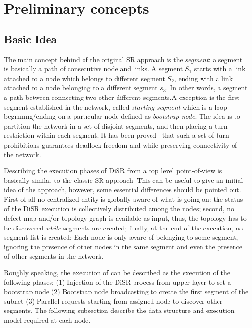 
\section{Preliminary concepts}
\label{sec:disr_concepts}

\subsection{Basic Idea}
The main concept behind of the original SR approach is the
\emph{segment}: a segment is basically a path of consecutive node and
links. A segment $S_1$ starts with a link attached to a node which
belongs to different segment $S_2$, ending with a link attached to a
node belonging to a different segment $s_3$. In other words, a segment
a path between connecting two other different segments.A exception is
the first segment established in the network, called \emph{starting
segment} which is  a loop beginning/ending on a particular node
defined as \emph{bootstrap node}.
The idea is to partition the network in a set of disjoint segments, and then
placing a turn restriction within each segment. It has been proved~\cite{mejia_ipdps06}
that such a set of turn prohibitions guarantees deadlock freedom and
while preserving connectivity of the network.

Describing the execution phases of DiSR from a top level point-of-view
is basically similar to the classic SR approach. This can be useful to
give an initial idea of the approach, however, some essential
differences should be pointed out. First of all no centralized entity is
globally aware of what is going on: the status of the DiSR execution
is collectively distributed among the nodes; second, no defect map and/or
topology graph is available as input, thus, the topology has to be
discovered \emph{while} segments are created; finally, at the end of the
execution, no segment list is created: Each node is only aware of
belonging to some segment, ignoring the presence of other nodes
in the same segment and even the presence of other segments in the
network.

Roughly speaking, the execution of can be described as the execution
of the following phases: (1) Injection of the DiSR process from upper layer to set a bootstrap
node (2) Bootstrap node broadcasting to create the first segment of the subnet
(3) Parallel requests starting from assigned node to discover other
segments. The following subsection describe the data structure and
execution model required at each node.

